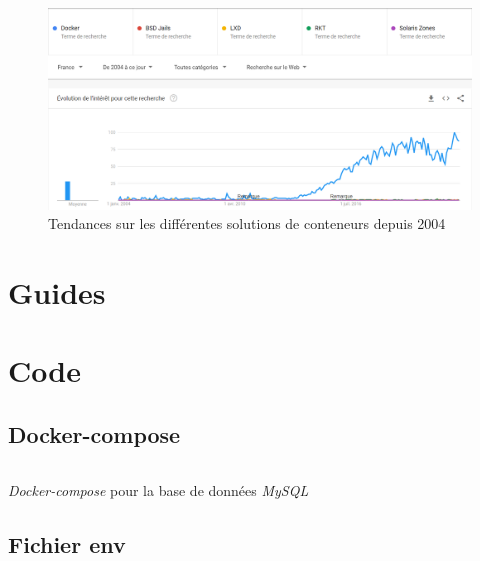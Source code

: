 \documentclass[
    iai, %
    il, %
]{heig-tb}
\begin{document}
\begin{center}
    \begin{figure}[H]
        \includegraphics[width=\textwidth]{./assets/figures/google-trend-containers-2022.png}
        \caption[Tendances solutions de conteneurs]{Tendances sur les différentes solutions de conteneurs depuis 2004 \label{containers-trends}}
    \end{figure}
\end{center}

\chapter{Guides}







\chapter{Code}

\section{Docker-compose}

\begin{listing}[h]
    \inputminted{yaml}{assets/code/docker-compose-mysql.yml}
    \caption{\emph{Docker-compose} pour la base de données \emph{MySQL} \label{docker-compose-mysql}}
\end{listing}

\section{Fichier env}
\end{document}

